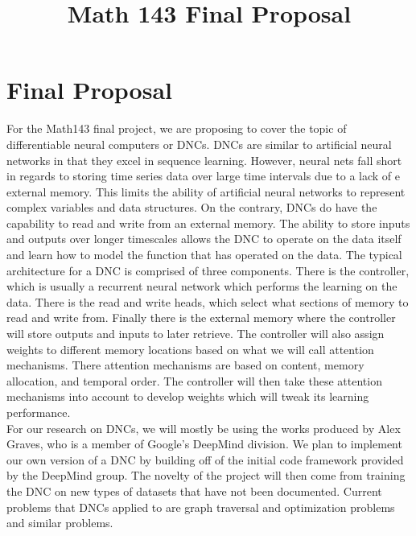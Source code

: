 \documentclass[11pt,letterpaper,cm]{hmcpset}
\title{Math 143 Final Proposal}
\begin{document}
\section{Final Proposal}
For the Math143 final project, we are proposing to cover the topic of differentiable neural computers or DNCs.
DNCs are similar to artificial neural networks in that they excel in sequence learning. 
However, neural nets fall short in regards to storing time series data over large time intervals due to a lack of e external memory. 
This limits the ability of artificial neural networks to represent complex variables and data structures. 
On the contrary, DNCs do have the capability to read and write from an external memory.
The ability to store inputs and outputs over longer timescales allows the DNC to operate on the data itself and learn how to model the function that has operated on the data.
The typical architecture for a DNC is comprised of three components.
There is the controller, which is usually a recurrent neural network which performs the learning on the data.
There is the read and write heads, which select what sections of memory to read and write from.
Finally there is the external memory where the controller will store outputs and inputs to later retrieve.
The controller will also assign weights to different memory locations based on what we will call attention mechanisms. 
There attention mechanisms are based on content, memory allocation, and temporal order.
The controller will then take these attention mechanisms into account to develop weights which will tweak its learning performance.
\\
\indent For our research on DNCs, we will mostly be using the works produced by Alex Graves, who is a member of Google's DeepMind division.
We plan to implement our own version of a DNC by building off of the initial code framework provided by the DeepMind group.
The novelty of the project will then come from training the DNC on new types of datasets that have not been documented. 
Current problems that DNCs applied to are graph traversal and optimization problems and similar problems.
\end{document}
